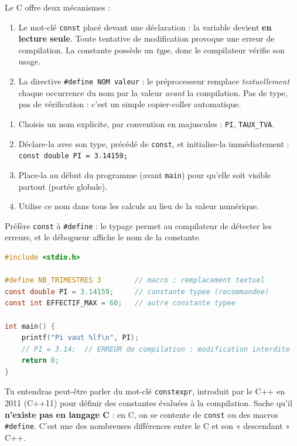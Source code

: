 \documentclass[11pt]{article}
\begin{document}
Le C offre deux mécanismes :

\begin{enumerate}
  \item Le mot-clé \texttt{const} placé devant une déclaration : la variable devient \textbf{en lecture seule}. Toute tentative de modification provoque une erreur de compilation. La constante possède un \emph{type}, donc le compilateur vérifie son usage.
  \item La directive \texttt{\#define NOM valeur} : le préprocesseur remplace \emph{textuellement} chaque occurrence du nom par la valeur \emph{avant} la compilation. Pas de type, pas de vérification : c'est un simple copier-coller automatique.
\end{enumerate}

\begin{methode}
\begin{enumerate}
  \item Choisis un nom explicite, par convention en majuscules : \texttt{PI}, \texttt{TAUX\_TVA}.
  \item Déclare-la avec son type, précédé de \texttt{const}, et initialise-la immédiatement : \texttt{const double PI = 3.14159;}
  \item Place-la au début du programme (avant \texttt{main}) pour qu'elle soit visible partout (portée globale).
  \item Utilise ce nom dans tous les calculs au lieu de la valeur numérique.
\end{enumerate}
Préfère \texttt{const} à \texttt{\#define} : le typage permet au compilateur de détecter les erreurs, et le débogueur affiche le nom de la constante.
\end{methode}

\begin{lstlisting}[language=C]
#include <stdio.h>

#define NB_TRIMESTRES 3        // macro : remplacement textuel
const double PI = 3.14159;     // constante typee (recommandee)
const int EFFECTIF_MAX = 60;   // autre constante typee

int main() {
    printf("Pi vaut %lf\n", PI);
    // PI = 3.14;  // ERREUR de compilation : modification interdite
    return 0;
}
\end{lstlisting}

\begin{savaistu}
Tu entendras peut-être parler du mot-clé \texttt{constexpr}, introduit par le C++ en 2011 (C++11) pour définir des constantes évaluées à la compilation. Sache qu'il \textbf{n'existe pas en langage C} : en C, on se contente de \texttt{const} ou des macros \texttt{\#define}. C'est une des nombreuses différences entre le C et son « descendant » C++.
\end{savaistu}
\end{document}
